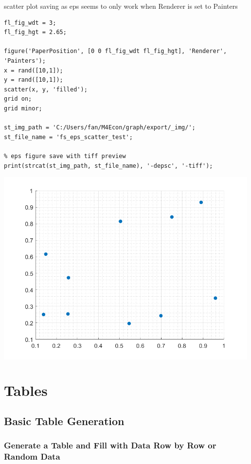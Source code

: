 \documentclass[
]{book}
\begin{document}
scatter plot saving as eps seems to only work when Renderer is set to
Painters

\begin{verbatim}
fl_fig_wdt = 3;
fl_fig_hgt = 2.65;

figure('PaperPosition', [0 0 fl_fig_wdt fl_fig_hgt], 'Renderer', 'Painters');
x = rand([10,1]);
y = rand([10,1]);
scatter(x, y, 'filled');
grid on;
grid minor;

st_img_path = 'C:/Users/fan/M4Econ/graph/export/_img/';
st_file_name = 'fs_eps_scatter_test';

% eps figure save with tiff preview
print(strcat(st_img_path, st_file_name), '-depsc', '-tiff');
\end{verbatim}

\includegraphics[width=5.20833in,height=\textheight]{img/fs_eps_images/figure_0.png}

\hypertarget{tables}{%
\chapter{Tables}\label{tables}}

\hypertarget{basic-table-generation}{%
\section{Basic Table Generation}\label{basic-table-generation}}

\hypertarget{generate-a-table-and-fill-with-data-row-by-row-or-random-data}{%
\subsection{Generate a Table and Fill with Data Row by Row or Random Data}\label{generate-a-table-and-fill-with-data-row-by-row-or-random-data}}
\end{document}
